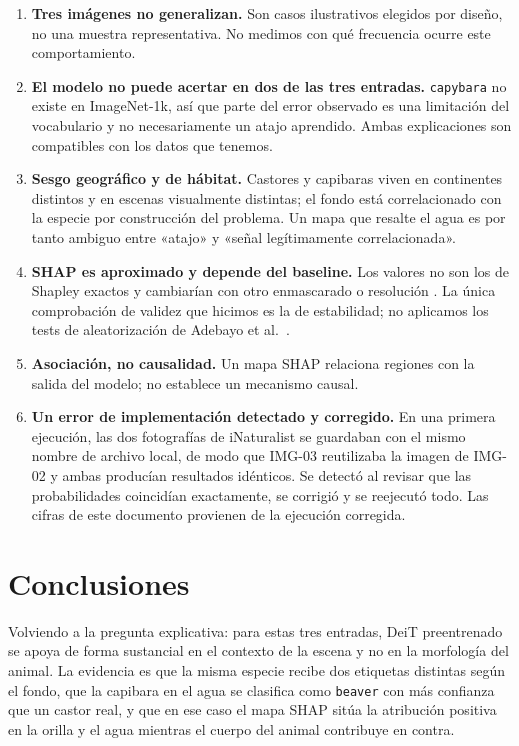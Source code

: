 \documentclass[11pt,a4paper]{article}
\begin{document}
\begin{enumerate}
  \item \textbf{Tres imágenes no generalizan.} Son casos ilustrativos elegidos por diseño, no
  una muestra representativa. No medimos con qué frecuencia ocurre este comportamiento.
  \item \textbf{El modelo no puede acertar en dos de las tres entradas.} \texttt{capybara} no
  existe en ImageNet-1k, así que parte del error observado es una limitación del vocabulario
  y no necesariamente un atajo aprendido. Ambas explicaciones son compatibles con los datos
  que tenemos.
  \item \textbf{Sesgo geográfico y de hábitat.} Castores y capibaras viven en continentes
  distintos y en escenas visualmente distintas; el fondo está correlacionado con la especie
  por construcción del problema. Un mapa que resalte el agua es por tanto ambiguo entre
  «atajo» y «señal legítimamente correlacionada».
  \item \textbf{SHAP es aproximado y depende del baseline.} Los valores no son los de Shapley
  exactos y cambiarían con otro enmascarado o resolución \cite{kumar2020problems}. La única
  comprobación de validez que hicimos es la de estabilidad; no aplicamos los tests de
  aleatorización de Adebayo et al.\ \cite{adebayo2018sanity}.
  \item \textbf{Asociación, no causalidad.} Un mapa SHAP relaciona regiones con la salida del
  modelo; no establece un mecanismo causal.
  \item \textbf{Un error de implementación detectado y corregido.} En una primera ejecución,
  las dos fotografías de iNaturalist se guardaban con el mismo nombre de archivo local, de
  modo que IMG-03 reutilizaba la imagen de IMG-02 y ambas producían resultados idénticos. Se
  detectó al revisar que las probabilidades coincidían exactamente, se corrigió y se
  reejecutó todo. Las cifras de este documento provienen de la ejecución corregida.
\end{enumerate}

\section{Conclusiones}

Volviendo a la pregunta explicativa: para estas tres entradas, DeiT preentrenado se apoya de
forma sustancial en el contexto de la escena y no en la morfología del animal. La evidencia
es que la misma especie recibe dos etiquetas distintas según el fondo, que la capibara en el
agua se clasifica como \texttt{beaver} con más confianza que un castor real, y que en ese
caso el mapa SHAP sitúa la atribución positiva en la orilla y el agua mientras el cuerpo del
animal contribuye en contra.
\end{document}
